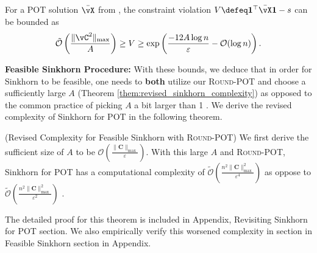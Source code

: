 \begin{theorem}
    \label{contraint_violation}
    For a POT solution $\Bar{\vX}$ from \citep{nhatho-mmpot}, the constraint violation $V \defeq \mathbf{1}^\top \bar{\vX} \mathbf{1} -s$ can be bounded as
    \begin{equation*}
    \tilde{\mathcal{O}}\left( \frac{\|\vC^2\|_{\text{max}}}{A}\right) \geq V \geq \exp\left(\frac{-12A \log{n}}{\varepsilon} - \mathcal{O}(\log n)\right).
    \end{equation*}
\end{theorem}
\textbf{Feasible Sinkhorn Procedure:} With these bounds, we deduce that in order for Sinkhorn to be feasible, one needs to \textbf{both} utilize our \textsc{Round-POT} and choose a sufficiently large $A$ (Theorem \ref{them:revised_sinkhorn_complexity}) as opposed to the common practice of picking $A$ a bit larger than 1 \citep{nhatho-mmpot}. We derive the revised complexity of Sinkhorn for POT in the following theorem.
\begin{theorem}
    \label{them:revised_sinkhorn_complexity}
    (Revised Complexity for Feasible Sinkhorn with \textsc{Round-POT}) We first derive the sufficient size of $A$ to be $\mathcal{O} \left( \frac{\|\mathbf{C}\|_{\text{max}}}{\varepsilon} \right)$. With this large $A$ and \textsc{Round-POT}, Sinkhorn for POT has a computational complexity of $\tilde{\mathcal{O}} \left(\frac{n^2 \|\mathbf{C}\|^2_{\text{max}} }{\varepsilon^4} \right)$ as oppose to $\tilde{\mathcal{O}} \left(\frac{n^2 \|\mathbf{C}\|^2_{\text{max}} }{\varepsilon^2} \right)$ \cite{nhatho-mmpot}. 
\end{theorem}
The detailed proof for this theorem is included in Appendix, Revisiting Sinkhorn for POT section. We also empirically verify this worsened complexity in section in Feasible Sinkhorn section in Appendix. 
